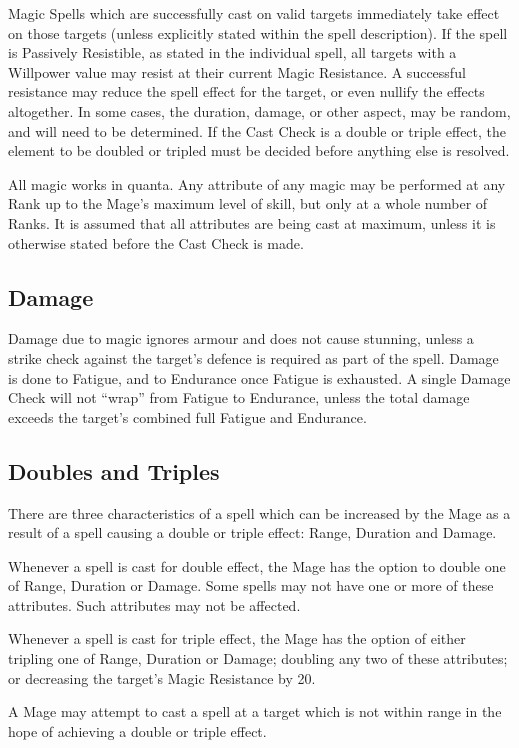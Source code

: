 \begin{Chapter}{Magic}
Spells which are successfully cast on valid targets immediately take
effect on those targets (unless explicitly stated within the spell
description). If the spell is Passively Resistible, as stated in the
individual spell, all targets with a Willpower value may resist at
their current Magic Resistance.  A successful resistance may reduce
the spell effect for the target, or even nullify the effects
altogether.  In some cases, the duration, damage, or other aspect, may
be random, and will need to be determined.  If the Cast Check is a
double or triple effect, the element to be doubled or tripled must be
decided before anything else is resolved.

All magic works in quanta.  Any attribute of any magic may be
performed at any Rank up to the Mage’s maximum level of skill, but
only at a whole number of Ranks.  It is assumed that all attributes
are being cast at maximum, unless it is otherwise stated before the
Cast Check is made.

\subsection{Damage}

Damage due to magic ignores armour and does not cause stunning, unless
a strike check against the target’s defence is required as part of the
spell.  Damage is done to Fatigue, and to Endurance once Fatigue is
exhausted. A single Damage Check will not “wrap” from Fatigue to
Endurance, unless the total damage exceeds the target’s combined full
Fatigue and Endurance.

\subsection{Doubles and Triples}

There are three characteristics of a spell which can be increased by
the Mage as a result of a spell causing a double or triple effect:
Range, Duration and Damage.

Whenever a spell is cast for double effect, the Mage has the option to
double one of Range, Duration or Damage. Some spells may not have one
or more of these attributes. Such attributes may not be affected.

Whenever a spell is cast for triple effect, the Mage has the option of
either tripling one of Range, Duration or Damage; doubling any two of
these attributes; or decreasing the target’s Magic Resistance by 20.

A Mage may attempt to cast a spell at a target which is not within
range in the hope of achieving a double or triple effect.



\end{Chapter}
